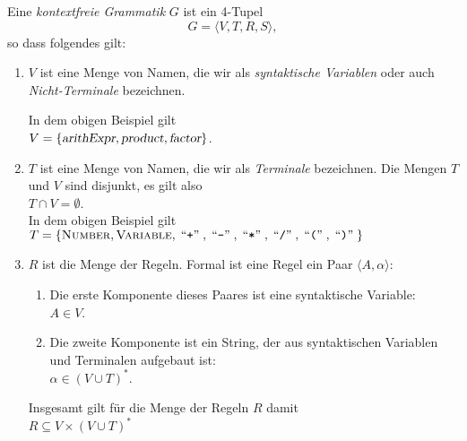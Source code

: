 \begin{Definition}
Eine \emph{kontextfreie Grammatik} $G$ ist ein 4-Tupel 
\[ 
   G = \langle V, T, R, S \rangle,
\]
so dass folgendes gilt:
\begin{enumerate}
\item $V$ ist eine Menge von Namen, die wir als \emph{syntaktische Variablen} oder auch
      \emph{Nicht-Terminale} bezeichnen. 
      
      In dem obigen Beispiel gilt 
      \\[0.2cm]
      \hspace*{1.3cm}
      $V = \{ \textsl{arithExpr}, \textsl{product}, \textsl{factor} \}$.
\item $T$ ist eine Menge von Namen, die wir als \emph{Terminale} bezeichnen.  
      Die Mengen $T$ und $V$ sind disjunkt, es gilt also
      \\[0.2cm]
      \hspace*{1.3cm}
      $T \cap V = \emptyset$.
      \\[0.2cm]
      In dem obigen Beispiel gilt
      \\[0.2cm]
      \hspace*{1.3cm}
      $T = \{ \textsc{Number}, \textsc{Variable}, \;\mbox{``\texttt{+}''}\;, \;\mbox{``\texttt{-}''}\;, \;\mbox{``\texttt{*}''}\;, \;\mbox{``\texttt{/}''}\;, \;\mbox{``\texttt{(}''}\;, \;\mbox{``\texttt{)}''}\; \}$
\item $R$ ist die Menge der Regeln.  Formal ist eine Regel ein Paar $\langle A, \alpha \rangle$:
      \begin{enumerate}
      \item Die erste Komponente dieses Paares ist eine syntaktische Variable:
            \\[0.2cm]
            \hspace*{1.3cm}
            $A \in V$.
      \item Die zweite Komponente ist ein String, der aus syntaktischen Variablen und 
            Terminalen aufgebaut ist:
            \\[0.2cm]
            \hspace*{1.3cm}
            $\alpha \in (V \cup T)^*$.
      \end{enumerate}
      Insgesamt gilt  f\"ur die Menge der Regeln $R$ damit
      \\[0.2cm]
      \hspace*{1.3cm}
      $R \subseteq V \times (V \cup T)^*$
      

\end{enumerate}
\end{Definition}
